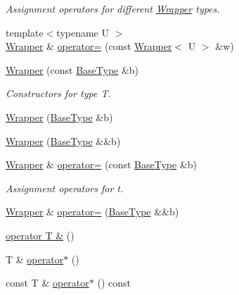 \begin{DoxyCompactItemize}
\begin{DoxyCompactList}\small\item\em Assignment operators for different \hyperlink{structhandy_1_1Wrapper}{Wrapper} types. \end{DoxyCompactList}\item 
{\footnotesize template$<$typename U $>$ }\\\hyperlink{structhandy_1_1Wrapper}{Wrapper} \& \hyperlink{structhandy_1_1Wrapper_aee34331bd7d6140e315342448f6369f8}{operator=} (const \hyperlink{structhandy_1_1Wrapper}{Wrapper}$<$ U $>$ \&w)
\item 
\hyperlink{structhandy_1_1Wrapper_a397d59e16dd28a0e023ad34b7a83b6b9}{Wrapper} (const \hyperlink{structhandy_1_1Wrapper_ae1b1bf1b6e0b270b98fa2028638117b4}{Base\+Type} \&b)
\begin{DoxyCompactList}\small\item\em Constructors for type \textquotesingle{}T\textquotesingle{}. \end{DoxyCompactList}\item 
\hyperlink{structhandy_1_1Wrapper_ae8c7f34f32266b54c575e744bc8647fb}{Wrapper} (\hyperlink{structhandy_1_1Wrapper_ae1b1bf1b6e0b270b98fa2028638117b4}{Base\+Type} \&b)
\item 
\hyperlink{structhandy_1_1Wrapper_a91c82e51848a814a3ec4d0f38a234506}{Wrapper} (\hyperlink{structhandy_1_1Wrapper_ae1b1bf1b6e0b270b98fa2028638117b4}{Base\+Type} \&\&b)
\item 
\hyperlink{structhandy_1_1Wrapper}{Wrapper} \& \hyperlink{structhandy_1_1Wrapper_a30a4b3773fadc2358367be67d407075f}{operator=} (const \hyperlink{structhandy_1_1Wrapper_ae1b1bf1b6e0b270b98fa2028638117b4}{Base\+Type} \&b)
\begin{DoxyCompactList}\small\item\em Assignment operators for t. \end{DoxyCompactList}\item 
\hyperlink{structhandy_1_1Wrapper}{Wrapper} \& \hyperlink{structhandy_1_1Wrapper_a13d5e5f7dfb6987f879cdb45d721fdd8}{operator=} (\hyperlink{structhandy_1_1Wrapper_ae1b1bf1b6e0b270b98fa2028638117b4}{Base\+Type} \&\&b)
\item 
\hyperlink{structhandy_1_1Wrapper_a9606ef04c47dc8b876e33aaeacc35aec}{operator T \&} ()
\item 
T \& \hyperlink{structhandy_1_1Wrapper_ae599b4bd3d85df3edc412f85acc98a76}{operator$\ast$} ()
\item 
const T \& \hyperlink{structhandy_1_1Wrapper_a9b5df6d806fbe66b27f806291635675a}{operator$\ast$} () const 

\end{DoxyCompactItemize}
